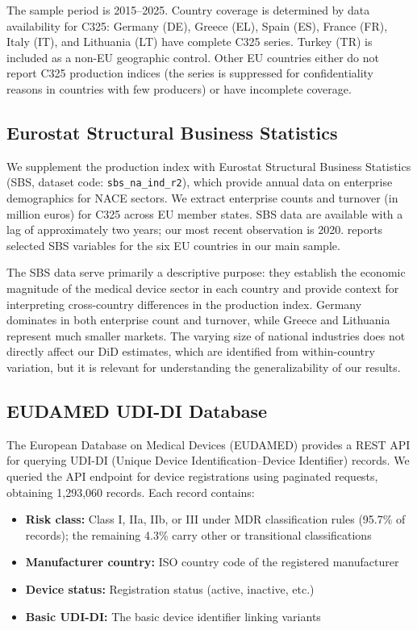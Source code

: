 \documentclass[12pt]{article}
\begin{document}
The sample period is 2015--2025. Country coverage is determined by data availability for C325: Germany (DE), Greece (EL), Spain (ES), France (FR), Italy (IT), and Lithuania (LT) have complete C325 series. Turkey (TR) is included as a non-EU geographic control. Other EU countries either do not report C325 production indices (the series is suppressed for confidentiality reasons in countries with few producers) or have incomplete coverage.

\subsection{Eurostat Structural Business Statistics}

We supplement the production index with Eurostat Structural Business Statistics (SBS, dataset code: \texttt{sbs\_na\_ind\_r2}), which provide annual data on enterprise demographics for NACE sectors. We extract enterprise counts and turnover (in million euros) for C325 across EU member states. SBS data are available with a lag of approximately two years; our most recent observation is 2020.  reports selected SBS variables for the six EU countries in our main sample.



The SBS data serve primarily a descriptive purpose: they establish the economic magnitude of the medical device sector in each country and provide context for interpreting cross-country differences in the production index. Germany dominates in both enterprise count and turnover, while Greece and Lithuania represent much smaller markets. The varying size of national industries does not directly affect our DiD estimates, which are identified from within-country variation, but it is relevant for understanding the generalizability of our results.

\subsection{EUDAMED UDI-DI Database}

The European Database on Medical Devices (EUDAMED) provides a REST API for querying UDI-DI (Unique Device Identification--Device Identifier) records. We queried the API endpoint for device registrations using paginated requests, obtaining 1,293,060 records. Each record contains:
\begin{itemize}
\item \textbf{Risk class:} Class I, IIa, IIb, or III under MDR classification rules (95.7\% of records); the remaining 4.3\% carry other or transitional classifications
\item \textbf{Manufacturer country:} ISO country code of the registered manufacturer
\item \textbf{Device status:} Registration status (active, inactive, etc.)
\item \textbf{Basic UDI-DI:} The basic device identifier linking variants
\end{itemize}
\end{document}
